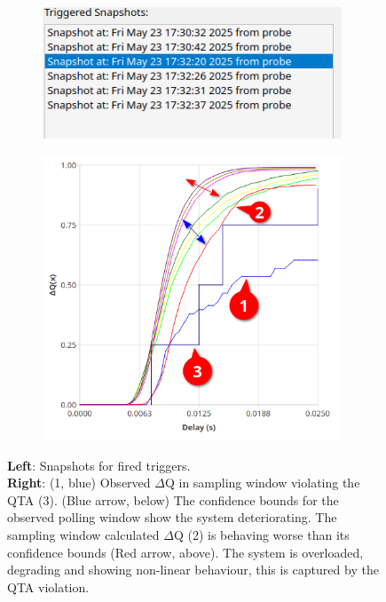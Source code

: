        \begin{figure}[H]
            \centering
            \begin{subfigure}{.5\textwidth}
                \centering
                \includegraphics[width=0.98\textwidth]{img/violated.png}
                \label{fig:high_load_1}
            \end{subfigure}%
            \begin{subfigure}{.5\textwidth}
                \centering
                \includegraphics[width =0.98\textwidth]{img/overload_2/qta_triggerd2.png}
                \label{fig:high_load_2}
            \end{subfigure}
            \caption{\textbf{Left}: Snapshots for fired triggers. \\
            \textbf{Right}: (1, blue) Observed $\Delta$Q in sampling window violating the QTA (3). (Blue arrow, below) The confidence bounds for the observed polling window show the system deteriorating. The sampling window calculated $\Delta$Q (2) is behaving worse than its confidence bounds (Red arrow, above). The system is overloaded, degrading and showing non-linear behaviour, this is captured by the QTA violation.} %
            \label{fig:qta_viol_1}
        \end{figure}
